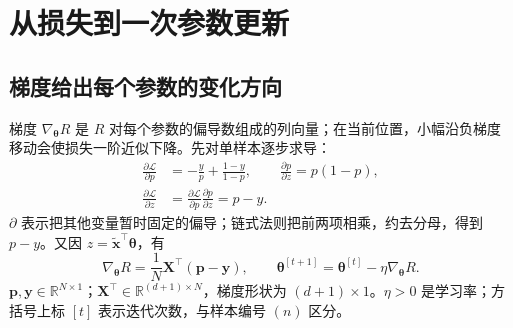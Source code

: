\documentclass[UTF8,a4paper,11pt,fontset=fandol]{ctexart}
\begin{document}
\section{从损失到一次参数更新}
\subsection{梯度给出每个参数的变化方向}
梯度 $\nabla_{\boldsymbol\theta}R$ 是 $R$ 对每个参数的偏导数组成的列向量；在当前位置，小幅沿负梯度移动会使损失一阶近似下降。先对单样本逐步求导：
\begin{equation}
\begin{aligned}
\frac{\partial\mathcal L}{\partial p}&=-\frac yp+\frac{1-y}{1-p},\qquad
\frac{\partial p}{\partial z}=p(1-p),\\
\frac{\partial\mathcal L}{\partial z}&=\frac{\partial\mathcal L}{\partial p}\frac{\partial p}{\partial z}=p-y.
\end{aligned}
\end{equation}
$\partial$ 表示把其他变量暂时固定的偏导；链式法则把前两项相乘，约去分母，得到 $p-y$。又因 $z=\tilde{\mathbf x}^{\top}\boldsymbol\theta$，有
\begin{equation}
\nabla_{\boldsymbol\theta}R=\frac1N\mathbf X^\top(\mathbf p-\mathbf y),\qquad
\boldsymbol\theta^{[t+1]}=\boldsymbol\theta^{[t]}-\eta\nabla_{\boldsymbol\theta}R.
\end{equation}
$\mathbf p,\mathbf y\in\mathbb R^{N\times1}$；$\mathbf X^\top\in\mathbb R^{(d+1)\times N}$，梯度形状为 $(d+1)\times1$。$\eta>0$ 是学习率；方括号上标 $[t]$ 表示迭代次数，与样本编号 $(n)$ 区分。
\end{document}
